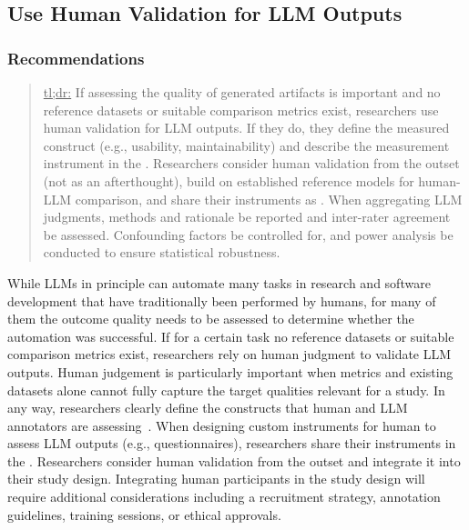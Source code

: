 



\subsection{Use Human Validation for LLM Outputs}

\subsubsection{Recommendations}

\begin{quote}
\underline{tl;dr:} If assessing the quality of generated artifacts is important and no reference datasets or suitable comparison metrics exist, researchers \should use human validation for LLM outputs. If they do, they \must define the measured construct (e.g., usability, maintainability) and describe the measurement instrument in the \paper. Researchers \should consider human validation from the outset (not as an afterthought), build on established reference models for human-LLM comparison, and share their instruments as \supplementarymaterial. When aggregating LLM judgments, methods and rationale \should be reported and inter-rater agreement \should be assessed. Confounding factors \should be controlled for, and power analysis \should be conducted to ensure statistical robustness.
\end{quote}

While LLMs in principle can automate many tasks in research and software development that have traditionally been performed by humans, for many of them the outcome quality needs to be assessed to determine whether the automation was successful.
If for a certain task no reference datasets or suitable comparison metrics exist, researchers \should rely on human judgment to validate LLM outputs.
Human judgement is particularly important when metrics and existing datasets alone cannot fully capture the target qualities relevant for a study.
In any way, researchers \must clearly define the constructs that human and LLM annotators are assessing~\cite{DBLP:conf/ease/RalphT18}.
When designing custom instruments for human to assess LLM outputs (e.g., questionnaires), researchers \should share their instruments in the \supplementarymaterial.
Researchers \should consider human validation from the outset and integrate it into their study design.
Integrating human participants in the study design will require additional considerations including a recruitment strategy, annotation guidelines, training sessions, or ethical approvals.


